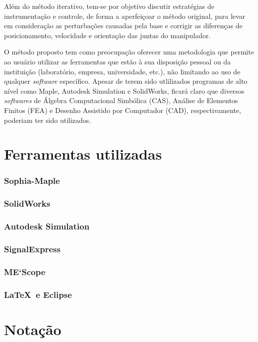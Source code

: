 Além do método iterativo, tem-se por objetivo discutir estratégias de
instrumentação e controle, de forma a aperfeiçoar o método original, para levar
em consideração as perturbações causadas pela base e corrigir as diferenças de
posicionamento, velocidade e orientação das juntas do manipulador.

O método proposto tem como preocupação oferecer uma metodologia que permite ao
usuário utilizar as ferramentas que estão à sua disposição pessoal ou da
instituição (laboratório, empresa, universidade, etc.), não limitando ao uso de
qualquer \textit{software} específico. Apesar de terem sido utlilizados
programas de alto nível como Maple, Autodesk Simulation e SolidWorks, ficará
claro que diversos \textit{softwares} de Álgebra Computacional Simbólica (CAS),
Análise de Elementos Finitos (FEA) e Desenho Assistido por Computador (CAD),
respectivamente, poderiam ter sido utilizados.


\section{Ferramentas utilizadas}

\subsubsection{Sophia-Maple}

\subsubsection{SolidWorks}

\subsubsection{Autodesk Simulation}

\subsubsection{SignalExpress}

\subsubsection{ME`Scope}

\subsubsection{\LaTeX\ e Eclipse}

\section{Notação}
